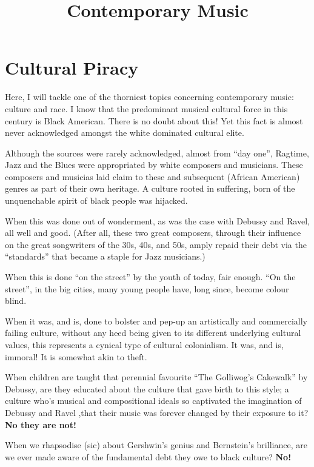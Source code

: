 \documentclass{article}
\title{Contemporary Music}
\date{}
\begin{document}
\maketitle
\tableofcontents

\pagebreak
\section{Cultural Piracy}

Here, I will tackle one of the thorniest topics concerning contemporary music: culture and race.
I know that the predominant musical cultural force in this century is Black American.
There is no doubt about this!
Yet this fact is almost never acknowledged amongst the white dominated cultural elite.

Although the sources were rarely acknowledged, almost from ``day one'', Ragtime, Jazz and the Blues were appropriated by white composers and musicians.
These composers and musicias laid claim to these and subsequent (African American) genres as part of their own heritage.
A culture rooted in suffering, born of the unquenchable spirit of black people was hijacked.

When this was done out of wonderment, as was the case with Debussy and Ravel, all well and good.
(After all, these two great composers, through their influence on the great songwriters of the 30s, 40s, and 50s, amply repaid their debt via the ``standards'' that became a staple for Jazz musicians.)

When this is done ``on the street'' by the youth of today, fair enough.
``On the street'', in the big cities, many young people have, long since, become colour blind.

When it was, and is, done to bolster and pep-up an artistically and commercially failing culture, without any heed being given to its different underlying cultural values, this represents a cynical type of cultural colonialism.
It was, and is, immoral!
It is somewhat akin to theft.

When children are taught that perennial favourite ``The Golliwog's Cakewalk'' by Debussy, are they educated about the culture that gave birth to this style; a culture who's musical and compositional ideals so captivated the imagination of Debussy and Ravel ,that their music was forever changed by their exposure to it?
\textbf{No they are not!}

When we rhapsodise (sic) about Gershwin's genius and Bernstein's brilliance, are we ever made aware of the fundamental debt they owe to black culture?
\textbf{No!}
\end{document}
